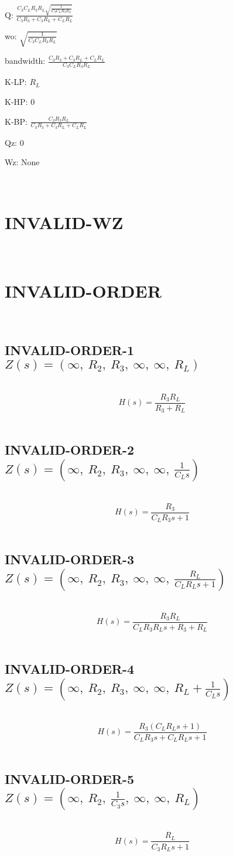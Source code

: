 \documentclass{article}
\begin{document}
Q: $\frac{C_{3} C_{L} R_{3} R_{L} \sqrt{\frac{1}{C_{3} C_{L} R_{3} R_{L}}}}{C_{3} R_{3} + C_{3} R_{L} + C_{L} R_{L}}$\ 

wo: $\sqrt{\frac{1}{C_{3} C_{L} R_{3} R_{L}}}$\ 

bandwidth: $\frac{C_{3} R_{3} + C_{3} R_{L} + C_{L} R_{L}}{C_{3} C_{L} R_{3} R_{L}}$\ 

K-LP: $R_{L}$\ 

K-HP: $0$\ 

K-BP: $\frac{C_{3} R_{3} R_{L}}{C_{3} R_{3} + C_{3} R_{L} + C_{L} R_{L}}$\ 

Qz: $0$\ 

Wz: $\text{None}$\ 

\ 

\section{INVALID-WZ}\ 
\section{INVALID-ORDER}\ 
\subsection{INVALID-ORDER-1 $Z(s) = \left( \infty, \  R_{2}, \  R_{3}, \  \infty, \  \infty, \  R_{L}\right)$ } \ 
\textbf{\[H(s) = \frac{R_{3} R_{L}}{R_{3} + R_{L}}\] } \ 
\subsection{INVALID-ORDER-2 $Z(s) = \left( \infty, \  R_{2}, \  R_{3}, \  \infty, \  \infty, \  \frac{1}{C_{L} s}\right)$ } \ 
\textbf{\[H(s) = \frac{R_{3}}{C_{L} R_{3} s + 1}\] } \ 
\subsection{INVALID-ORDER-3 $Z(s) = \left( \infty, \  R_{2}, \  R_{3}, \  \infty, \  \infty, \  \frac{R_{L}}{C_{L} R_{L} s + 1}\right)$ } \ 
\textbf{\[H(s) = \frac{R_{3} R_{L}}{C_{L} R_{3} R_{L} s + R_{3} + R_{L}}\] } \ 
\subsection{INVALID-ORDER-4 $Z(s) = \left( \infty, \  R_{2}, \  R_{3}, \  \infty, \  \infty, \  R_{L} + \frac{1}{C_{L} s}\right)$ } \ 
\textbf{\[H(s) = \frac{R_{3} \left(C_{L} R_{L} s + 1\right)}{C_{L} R_{3} s + C_{L} R_{L} s + 1}\] } \ 
\subsection{INVALID-ORDER-5 $Z(s) = \left( \infty, \  R_{2}, \  \frac{1}{C_{3} s}, \  \infty, \  \infty, \  R_{L}\right)$ } \ 
\textbf{\[H(s) = \frac{R_{L}}{C_{3} R_{L} s + 1}\] } \ 
\end{document}
